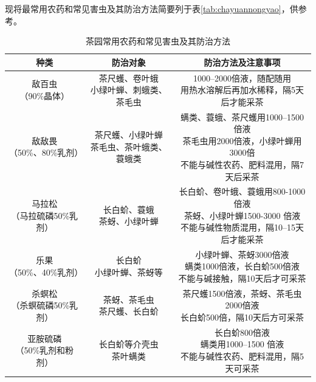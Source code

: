 \documentclass{ctexbook}
\begin{document}
现将最常用农药和常见害虫及其防治方法简要列于表\ref{tab:chayuannongyao}，供参考。
\begin{table}[htbp]
	\centering
	\caption{茶园常用农药和常见害虫及其防治方法}
	\begin{tabular}{c|c|c}
		\hline
		种类    & 防治对象  & 防治方法及注意事项 \\
		\hline
		\thead{敌百虫\\（90\%晶体）} & \thead{茶尺蠖、卷叶蛾\\小绿叶蝉、刺蛾类、茶毛虫} & \thead{1000--2000倍液，随配随用\\用热水溶解后再加水稀释，隔5天后才能采茶} \\
		\hline
		\thead{敌敌畏\\（50\%、80\%乳剂）} & \thead{茶尺蠖、小绿叶蝉\\茶毛虫、茶叶蛾类、蓑蛾类} & \thead{螨类、蓑蛾、茶尺蠖用1000--1500倍液\\茶毛虫用2000倍液，小绿叶蝉用3000倍\\不能与碱性农药、肥料混用，隔7天后采茶} \\
		\hline
		\thead{马拉松\\（马拉硫磷50\%乳剂）} & \thead{长白蚧、蓑蛾\\茶蚜、小绿叶蝉} & \thead{长白蚧、卷叶蛾、蓑蛾用800-1000 倍液\\茶蚜、小绿叶蝉1500-3000 倍液\\不能与碱性物质混用，隔10--15天后才能采茶} \\
		\hline
		\thead{乐果\\（50\%、40\%乳剂）} & \thead{长白蚧\\小绿叶蝉、茶蚜等} & \thead{小绿叶蝉、茶蚜3000倍液\\螨类1000倍液，长白蚧500倍液\\不能与碱接触，隔10天后才可采茶} \\
		\hline
		\thead{杀螟松\\（杀螟硫磷50\%乳剂）} & \thead{茶蚜、茶毛虫\\茶尺蠖、长白蚧} & \thead{茶尺蠖1500倍液，茶蚜、茶毛虫2000倍液\\长白蚧500倍，隔10天后方可采茶} \\
		\hline
		\thead{亚胺硫磷\\（50\%乳剂和粉剂）} & \thead{长白蚧等介壳虫\\茶叶螨类} &\thead{长白蚧800倍液\\螨类用1000--1500 倍液\\不能与碱性农药、肥料混用，隔5天可采茶}\\

\end{tabular}
\end{table}
\end{document}
